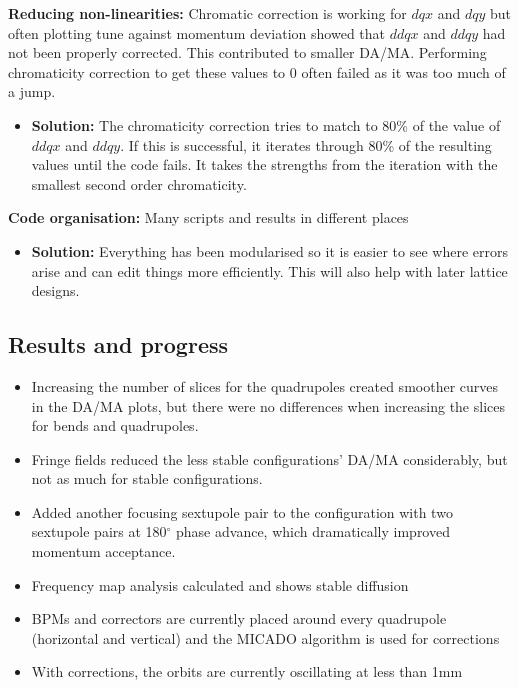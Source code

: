 \documentclass{article}
\begin{document}
\textbf{Reducing non-linearities:} Chromatic correction is working for $dqx$ and $dqy$ but often plotting tune against momentum deviation showed that $ddqx$ and $ddqy$ had not been properly corrected. This contributed to smaller DA/MA. Performing chromaticity correction to get these values to 0 often failed as it was too much of a jump.
\begin{itemize}
    \item \textbf{Solution:} The chromaticity correction tries to match to 80\% of the value of $ddqx$ and $ddqy$. If this is successful, it iterates through 80\% of the resulting values until the code fails. It takes the strengths from the iteration with the smallest second order chromaticity.
\end{itemize}


\textbf{Code organisation:} Many scripts and results in different places
\begin{itemize}
    \item \textbf{Solution:} Everything has been modularised so it is easier to see where errors arise and can edit things more efficiently. This will also help with later lattice designs.
\end{itemize}

\subsection{Results and progress}
\begin{itemize}
    \item Increasing the number of slices for the quadrupoles created smoother curves in the DA/MA plots, but there were no differences when increasing the slices for bends and quadrupoles.
    \item Fringe fields reduced the less stable configurations' DA/MA considerably, but not as much for stable configurations.
    \item Added another focusing sextupole pair to the configuration with two sextupole pairs at 180$^\circ$ phase advance, which dramatically improved momentum acceptance.
    \item Frequency map analysis calculated and shows stable diffusion
    \item BPMs and correctors are currently placed around every quadrupole (horizontal and vertical) and the MICADO algorithm is used for corrections
    \item With corrections, the orbits are currently oscillating at less than 1mm
\end{itemize}
\end{document}
